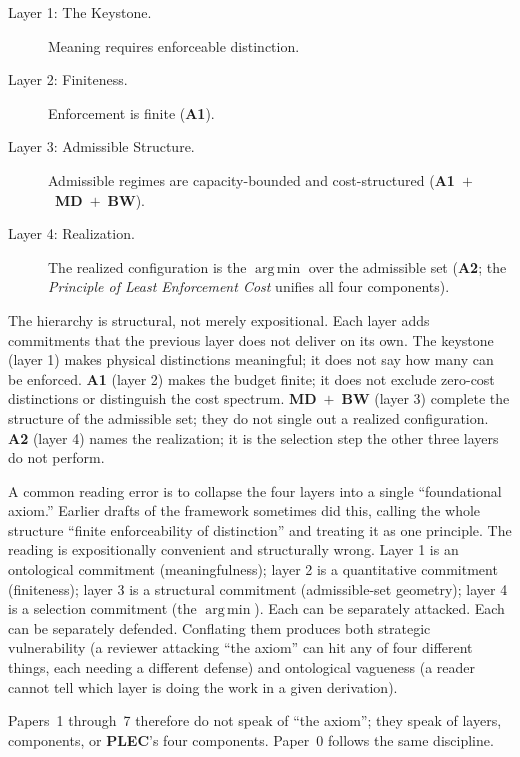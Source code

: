 \documentclass[11pt]{article}
\newcommand{\Aone}{\textbf{A1}}
\newcommand{\PLEC}{\textbf{PLEC}}
\newcommand{\argmin}{\mathop{\mathrm{arg\,min}}}
\begin{document}
\begin{tcolorbox}[apfbox, title={The Four-Layer Ontological Hierarchy}]
\begin{description}
    \item[Layer 1: The Keystone.] Meaning requires enforceable distinction.
    \item[Layer 2: Finiteness.] Enforcement is finite (\Aone{}).
    \item[Layer 3: Admissible Structure.] Admissible regimes are capacity-bounded and cost-structured (\Aone{}~$+$~\textbf{MD}~$+$~\textbf{BW}).
    \item[Layer 4: Realization.] The realized configuration is the $\argmin$ over the admissible set (\textbf{A2}; the \emph{Principle of Least Enforcement Cost} unifies all four components).
\end{description}
\end{tcolorbox}

\noindent The hierarchy is structural, not merely expositional. Each layer adds commitments that the previous layer does not deliver on its own. The keystone (layer 1) makes physical distinctions meaningful; it does not say how many can be enforced. \Aone{} (layer 2) makes the budget finite; it does not exclude zero-cost distinctions or distinguish the cost spectrum. \textbf{MD}~$+$~\textbf{BW} (layer 3) complete the structure of the admissible set; they do not single out a realized configuration. \textbf{A2} (layer 4) names the realization; it is the selection step the other three layers do not perform.

A common reading error is to collapse the four layers into a single ``foundational axiom.'' Earlier drafts of the framework sometimes did this, calling the whole structure ``finite enforceability of distinction'' and treating it as one principle. The reading is expositionally convenient and structurally wrong. Layer 1 is an ontological commitment (meaningfulness); layer 2 is a quantitative commitment (finiteness); layer 3 is a structural commitment (admissible-set geometry); layer 4 is a selection commitment (the $\argmin$). Each can be separately attacked. Each can be separately defended. Conflating them produces both strategic vulnerability (a reviewer attacking ``the axiom'' can hit any of four different things, each needing a different defense) and ontological vagueness (a reader cannot tell which layer is doing the work in a given derivation).

Papers~1 through~7 therefore do not speak of ``the axiom''; they speak of layers, components, or \PLEC{}'s four components. Paper~0 follows the same discipline.
\end{document}
